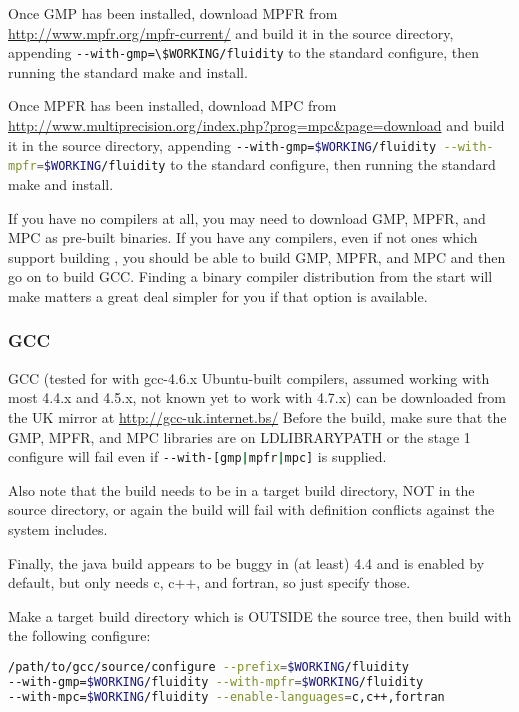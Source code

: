 Once GMP has been installed, download MPFR from
\url{http://www.mpfr.org/mpfr-current/} and build it in the source directory,
appending \lstinline[language=bash]+--with-gmp=\$WORKING/fluidity+ to the
standard configure, then running the standard make and install.

Once MPFR has been installed, download MPC from 
\url{http://www.multiprecision.org/index.php?prog=mpc&page=download} and build
it in the source directory, appending
\lstinline[language=bash]+--with-gmp=$WORKING/fluidity --with-mpfr=$WORKING/fluidity+ 
to the standard configure, then running the standard make and install.

If you have no compilers at all, you may need to download GMP, MPFR, and MPC as
pre-built binaries. If you have any compilers, even if not ones which support
building \fluidity, you should be able to build GMP, MPFR, and MPC and then go
on to build GCC. Finding a binary compiler distribution from the start will
make matters a great deal simpler for you if that option is available.


\subsubsection{GCC}
\label{sec:required_libraries_compilers_gcc}

GCC (tested for \fluidity with gcc-4.6.x Ubuntu-built compilers, assumed
working with most 4.4.x and 4.5.x, not known yet to work with 4.7.x) can be
downloaded from the UK mirror at \url{http://gcc-uk.internet.bs/} Before the
build, make sure that the GMP, MPFR, and MPC libraries are on
LD{\textunderscore}LIBRARY{\textunderscore}PATH or the stage 1 configure will
fail even if \lstinline[language=bash]+--with-[gmp|mpfr|mpc]+ is supplied.

Also note that the build needs to be in a target build directory, NOT in the
source directory, or again the build will fail with definition conflicts
against the system includes.

Finally, the java build appears to be buggy in (at least) 4.4 and is enabled by
default, but \fluidity only needs c, c++, and fortran, so just specify those.

Make a target build directory which is OUTSIDE the source tree, then build
with the following configure:

\begin{lstlisting}[language=bash]
/path/to/gcc/source/configure --prefix=$WORKING/fluidity 
--with-gmp=$WORKING/fluidity --with-mpfr=$WORKING/fluidity 
--with-mpc=$WORKING/fluidity --enable-languages=c,c++,fortran
\end{lstlisting}

